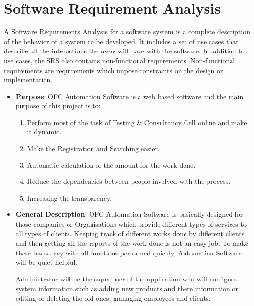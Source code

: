 \section{Software Requirement Analysis}
A Software Requirements Analysis for a software system is a complete 
description of the behavior of a system to be developed. It includes 
a set of use cases that describe all the interactions the users will 
have with the software. In addition to use cases, the SRS also contains 
non-functional requirements. Non-functional requirements are 
requirements which impose constraints on the design or implementation.
\begin{itemize}
\item{\bf Purpose}: OFC Automation Software is a web based software and the 
main purpose of this project is to:
\begin{enumerate}
\item Perform most of the task of Testing \& Consultancy Cell online 
and make it dynamic.
\item Make the Registration and Searching easier.
\item Automatic calculation of the amount for the work done.
\item Reduce the dependencies between people involved with the process.
\item Increasing the transparency.
\end{enumerate}
\item{\bf General Description}: OFC Automation Software is basically 
designed for those companies or Organisations which provide different 
types of services to all types of clients. Keeping track of different 
works done by different clients and then getting all the reports of 
the work done is not an easy job. To make these tasks easy with all 
functions performed quickly, Automation Software will be quiet helpful.

Administrator will be the super user of the application who will 
configure system information such as adding new products and there 
information or editing or deleting the old ones, managing employees 
and clients.


\end{itemize}
